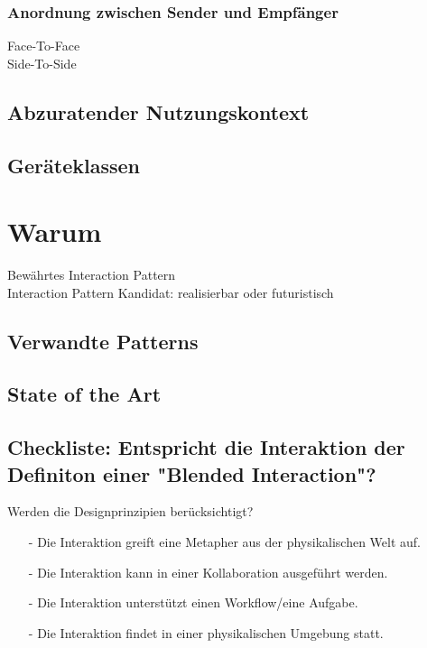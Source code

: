 \subsubsection*{Anordnung zwischen Sender und Empfänger}
\checkbox{\facetoface} Face-To-Face \\
\checkbox{\sidetoside} Side-To-Side

\subsection*{Abzuratender Nutzungskontext}
\notvalidcontext

\subsection*{Geräteklassen}
\devicetabular



\section*{Warum}
\checkbox{\established} Bewährtes Interaction Pattern \\
\checkbox{\candidate} Interaction Pattern Kandidat: 
\checkbox{\realizable} realisierbar oder
\checkbox{\futuristic} futuristisch

\subsection*{Verwandte Patterns}
\otherpatterns

\subsection*{State of the Art}
\stateoftheart

\subsection*{Checkliste: Entspricht die Interaktion der Definiton einer "Blended Interaction"?}
\checkbox{\designprinciples} Werden die Designprinzipien berücksichtigt?
\begin{itemize}
\item[-] Die Interaktion greift eine Metapher aus der physikalischen Welt auf.
\item[-] Die Interaktion kann in einer Kollaboration ausgeführt werden.
\item[-] Die Interaktion unterstützt einen Workflow/eine Aufgabe.
\item[-] Die Interaktion findet in einer physikalischen Umgebung statt.
\end{itemize} 

